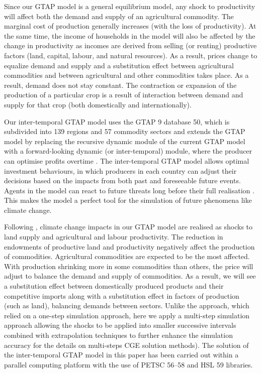 \documentclass[titlesmallcaps,copyrightpage]{uomthesis}\usepackage[]{graphicx}\usepackage[]{color}
\begin{document}
Since our GTAP model is a general equilibrium model, any shock to productivity will affect both the demand and supply of an agricultural commodity. The marginal cost of production generally increases (with the loss of productivity). At the same time, the income of households in the model will also be affected by the change in productivity as incomes are derived from selling (or renting) productive factors (land, capital, labour, and natural resources). As a result, prices change to equalize demand and supply and a substitution effect between agricultural commodities and between agricultural and other commodities takes place. As a result, demand does not stay constant. The contraction or expansion of the production of a particular crop is a result of interaction between demand and supply for that crop (both domestically and internationally). 

Our inter-temporal GTAP model uses the GTAP 9 database 50, which is subdivided into 139 regions and 57 commodity sectors \citep{aguiar_overview_2016} and extends the GTAP model by replacing the recursive dynamic module of the current GTAP model with a forward-looking dynamic (or inter-temporal) module, where the producer can optimise profits overtime \citep{van_ha_building_2017, kompas_effects_2018}. The inter-temporal GTAP model allows optimal investment behaviours, in which producers in each country can adjust their decisions based on the impacts from both past and foreseeable future events. Agents in the model can react to future threats long before their full realisation \citep{kompas_effects_2018}. This makes the model a perfect tool for the simulation of future phenomena like climate change.

Following \citet{roson_estimation_2016}, climate change impacts in our GTAP model are realised as shocks to land supply and agricultural and labour productivity. The reduction in endowments of productive land and productivity negatively affect the production of commodities. Agricultural commodities are expected to be the most affected. With production shrinking more in some commodities than others, the price will adjust to balance the demand and supply of commodities. As a result, we will see a substitution effect between domestically produced products and their competitive imports along with a substitution effect in factors of production (such as land), balancing demands between sectors.
Unlike the \citet{kompas_effects_2018} approach, which relied on a one-step simulation approach, here we apply a multi-step simulation approach allowing the shocks to be applied into smaller successive intervals combined with extrapolation techniques to further enhance the simulation accuracy \citep[see]{horridge_gempack_2018,pearson_solving_1991} for the details on multi-steps CGE solution methods). The solution of the inter-temporal GTAP model in this paper has been carried out within a parallel computing platform \citep{van_ha_solving_2016, kompas_curse_2018} with the use of PETSC 56–58 and HSL 59 libraries.
\end{document}
